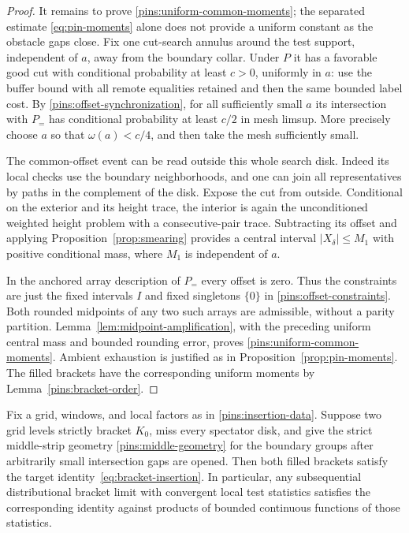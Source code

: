 \begin{proof}
It remains to prove \eqref{pins:uniform-common-moments}; the separated
estimate \eqref{eq:pin-moments} alone does not provide a uniform
constant as the obstacle gaps close.  Fix one cut-search annulus
around the test support, independent of $a$, away from the boundary
collar.  Under $P$ it has a favorable good cut with conditional
probability at least $c>0$, uniformly in $a$: use the buffer bound
with all remote equalities retained and then the same bounded label
cost.  By \eqref{pins:offset-synchronization}, for all sufficiently
small $a$ its intersection with $P_=$ has conditional probability
at least $c/2$ in mesh limsup.  More precisely choose $a$ so that
$\omega(a)<c/4$, and then take the mesh sufficiently small.

The common-offset event can be read outside this whole search disk.
Indeed its local checks use the boundary neighborhoods, and one can
join all representatives by paths in the complement of the disk.
Expose the cut from outside.  Conditional on the exterior and its
height trace, the interior is again the unconditioned weighted
height problem with a consecutive-pair trace.  Subtracting its
offset and applying Proposition~\ref{prop:smearing} provides a
central interval $|X_\delta|\le M_1$ with positive conditional mass,
where $M_1$ is independent of $a$.

In the anchored array description of $P_=$ every offset is zero.
Thus the constraints are just the fixed intervals $I$ and fixed
singletons $\{0\}$ in \eqref{pins:offset-constraints}.  Both rounded
midpoints of any two such arrays are admissible, without a parity
partition.  Lemma~\ref{lem:midpoint-amplification}, with the preceding
uniform central mass and bounded rounding error, proves
\eqref{pins:uniform-common-moments}.  Ambient exhaustion is justified
as in Proposition~\ref{prop:pin-moments}.  The filled brackets have
the corresponding uniform moments by Lemma~\ref{pins:bracket-order}.
\end{proof}

\begin{proposition}\label{prop:bracket-insertion}
Fix a grid, windows, and local factors as in
\eqref{pins:insertion-data}.  Suppose two grid levels strictly bracket
$K_0$, miss every spectator disk, and give the strict middle-strip
geometry \eqref{pins:middle-geometry} for the boundary groups after
arbitrarily small intersection gaps are opened.  Then both filled
brackets satisfy the target identity~\eqref{eq:bracket-insertion}.
In particular, any subsequential distributional bracket limit with
convergent local test statistics satisfies the corresponding identity
against products of bounded continuous functions of those statistics.
\end{proposition}

